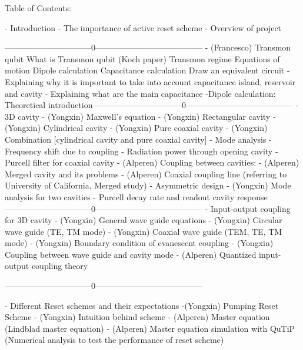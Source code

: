 Table of Contents:

- Introduction
    - The importance of active reset scheme
    - Overview of project
    
--------------------------------0---------------------------------------    
    - (Francesco) Transmon qubit
             What is Transmon qubit (Koch paper)
             Transmon regime
             Equations of motion
             Dipole calculation
             Capacitance calculation
             Draw an equivalent circuit
                - Explaining why it is important to take into account capacitance island, reservoir and cavity
            -  Explaining what are the main capacitance
            -Dipole calculation:
             Theoretical introduction
--------------------------------0--------------------------------------- 
    - 3D cavity
        - (Yongxin) Maxwell's equation
        - (Yongxin) Rectangular cavity
        - (Yongxin) Cylindrical cavity
        - (Yongxin) Pure coaxial cavity
        - (Yongxin) Combination [cylindrical cavity and pure coaxial cavity]
            - Mode analysis
            - Frequency shift due to coupling
            - Radiation power through opening cavity
        - Purcell filter for coaxial cavity
            - (Alperen) Coupling between cavities: 
                - (Alperen) Merged cavity and its problems
                - (Alperen) Coaxial coupling line (referring to University of California, Merged study)
            - Asymmetric design 
            - (Yongxin) Mode analysis for two cavities
            - Purcell decay rate and readout cavity response
--------------------------------0---------------------------------------
    - Input-output coupling for 3D cavity
        - (Yongxin) General wave guide equations
        - (Yongxin) Circular wave guide (TE, TM mode)
        - (Yongxin) Coaxial wave guide (TEM, TE, TM mode)
        - (Yongxin) Boundary condition of evanescent coupling
        - (Yongxin) Coupling between wave guide and cavity mode
        - (Alperen) Quantized input-output coupling theory
    
--------------------------------0---------------------------------------    

- Different Reset schemes and their expectations
    -(Yongxin) Pumping Reset Scheme
        - (Yongxin) Intuition behind scheme
        - (Alperen) Master equation (Lindblad master equation) 
        - (Alperen) Master equation simulation with QuTiP (Numerical analysis to test the performance of reset scheme)
        
